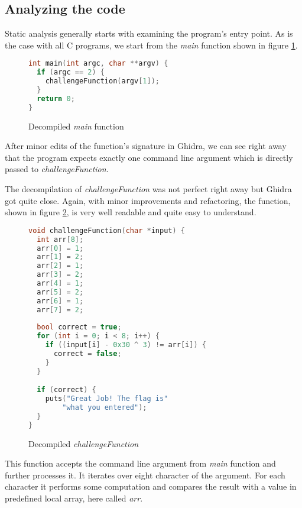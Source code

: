 \documentclass[conference]{IEEEtran}
\begin{document}
\subsection{Analyzing the code}

Static analysis generally starts with examining the program's entry point. As is the case with all C programs, we start from the \textit{main} function shown in figure \ref{fig:main-fn}.

\begin{figure}[ht!]
    \begin{lstlisting}[language=c]
int main(int argc, char **argv) {
  if (argc == 2) {
    challengeFunction(argv[1]);
  }
  return 0;
}
    \end{lstlisting}
    \caption{Decompiled \textit{main} function}
    \label{fig:main-fn}
\end{figure}

After minor edits of the function's signature in Ghidra, we can see right away that the program expects exactly one command line argument which is directly passed to \textit{challengeFunction}.

The decompilation of \textit{challengeFunction} was not perfect right away but Ghidra got quite close. Again, with minor improvements and refactoring, the function, shown in figure \ref{fig:challenge-fn}, is very well readable and quite easy to understand. 

\begin{figure}[ht!]
    \begin{lstlisting}[language=c]
void challengeFunction(char *input) {
  int arr[8];
  arr[0] = 1;
  arr[1] = 2;
  arr[2] = 1;
  arr[3] = 2;
  arr[4] = 1;
  arr[5] = 2;
  arr[6] = 1;
  arr[7] = 2;
  
  bool correct = true;
  for (int i = 0; i < 8; i++) {
    if ((input[i] - 0x30 ^ 3) != arr[i]) {
      correct = false;
    }
  }

  if (correct) {
    puts("Great Job! The flag is"
        "what you entered");
  }
}
    \end{lstlisting}
    \caption{Decompiled \textit{challengeFunction}}
    \label{fig:challenge-fn}
\end{figure}

This function accepts the command line argument from \textit{main} function and further processes it. It iterates over eight character of the argument. For each character it performs some computation and compares the result with a value in predefined local array, here called \textit{arr}.
\end{document}
